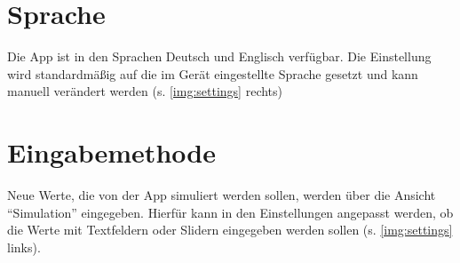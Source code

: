 	\section{Sprache}
	\label{sec:lang}
	
	Die App ist in den Sprachen Deutsch und Englisch verfügbar. Die Einstellung wird standardmäßig auf die im Gerät eingestellte Sprache gesetzt und kann manuell verändert werden (s. \cref{img:settings} rechts)
	
	\section{Eingabemethode}
	\label{sec:input}
	
	Neue Werte, die von der App simuliert werden sollen, werden über die Ansicht ``Simulation'' eingegeben. Hierfür kann in den Einstellungen angepasst werden, ob die Werte mit Textfeldern oder Slidern eingegeben werden sollen (s. \cref{img:settings} links).
	
